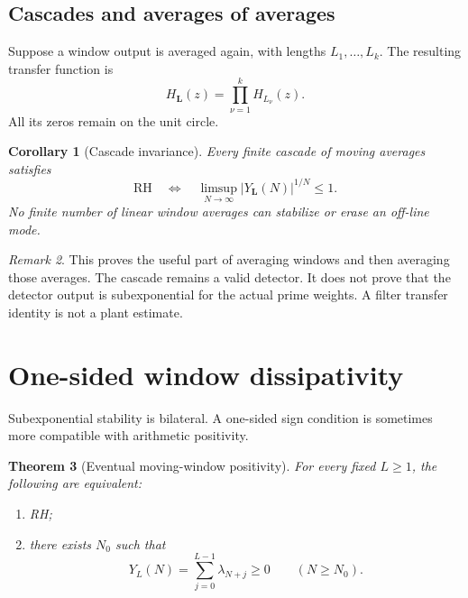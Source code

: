 \documentclass[11pt]{amsart}
\numberwithin{equation}{section}
\newtheorem{theorem}{Theorem}[section]
\newtheorem{corollary}[theorem]{Corollary}
\theoremstyle{definition}
\theoremstyle{remark}
\newtheorem{remark}[theorem]{Remark}
\newcommand{\RH}{\mathrm{RH}}
\begin{document}
\subsection{Cascades and averages of averages}

Suppose a window output is averaged again, with lengths
\(L_1,\ldots,L_k\). The resulting transfer function is
\begin{equation}
 H_{\boldsymbol L}(z)=\prod_{\nu=1}^kH_{L_\nu}(z).       \label{eq:3.7}
\end{equation}
All its zeros remain on the unit circle.

\begin{corollary}[Cascade invariance]
\label{cor:cascade}
Every finite cascade of moving averages satisfies
\begin{equation}
 \RH\quad\Longleftrightarrow\quad
 \limsup_{N\to\infty}|Y_{\boldsymbol L}(N)|^{1/N}\le1.
                                                        \label{eq:3.8}
\end{equation}
No finite number of linear window averages can stabilize or erase an
off-line mode.
\end{corollary}

\begin{remark}
This proves the useful part of averaging windows and then averaging those
averages. The cascade remains a valid detector. It does not prove that the
detector output is subexponential for the actual prime weights. A filter
transfer identity is not a plant estimate.
\end{remark}

\section{One-sided window dissipativity}

Subexponential stability is bilateral. A one-sided sign condition is
sometimes more compatible with arithmetic positivity.

\begin{theorem}[Eventual moving-window positivity]
\label{thm:window-positive}
For every fixed \(L\ge1\), the following are equivalent:
\begin{enumerate}
\item RH;
\item there exists \(N_0\) such that
      \begin{equation}
        Y_L(N)=\sum_{j=0}^{L-1}\lambda_{N+j}\ge0
        \qquad(N\ge N_0).                                \label{eq:4.1}
\end{equation}
\end{enumerate}
\end{theorem}
\end{document}
